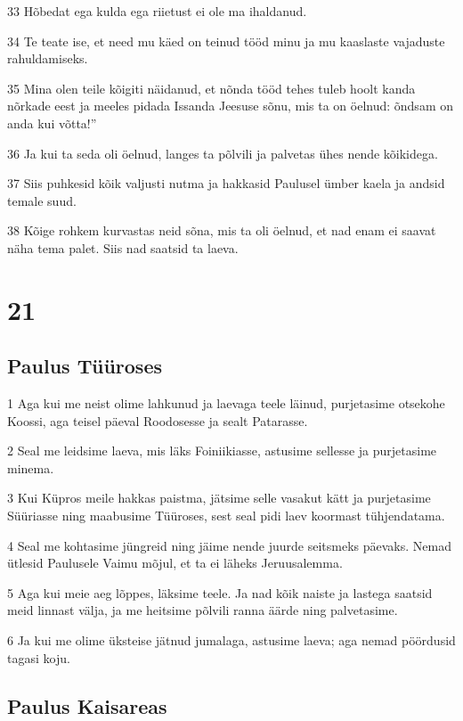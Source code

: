 \par 33 Hõbedat ega kulda ega riietust ei ole ma ihaldanud.
\par 34 Te teate ise, et need mu käed on teinud tööd minu ja mu kaaslaste vajaduste rahuldamiseks.
\par 35 Mina olen teile kõigiti näidanud, et nõnda tööd tehes tuleb hoolt kanda nõrkade eest ja meeles pidada Issanda Jeesuse sõnu, mis ta on öelnud: õndsam on anda kui võtta!”
\par 36 Ja kui ta seda oli öelnud, langes ta põlvili ja palvetas ühes nende kõikidega.
\par 37 Siis puhkesid kõik valjusti nutma ja hakkasid Paulusel ümber kaela ja andsid temale suud.
\par 38 Kõige rohkem kurvastas neid sõna, mis ta oli öelnud, et nad enam ei saavat näha tema palet. Siis nad saatsid ta laeva.


\chapter{21}

\section*{Paulus Tüüroses}

\par 1 Aga kui me neist olime lahkunud ja laevaga teele läinud, purjetasime otsekohe Koossi, aga teisel päeval Roodosesse ja sealt Patarasse.
\par 2 Seal me leidsime laeva, mis läks Foiniikiasse, astusime sellesse ja purjetasime minema.
\par 3 Kui Küpros meile hakkas paistma, jätsime selle vasakut kätt ja purjetasime Süüriasse ning maabusime Tüüroses, sest seal pidi laev koormast tühjendatama.
\par 4 Seal me kohtasime jüngreid ning jäime nende juurde seitsmeks päevaks. Nemad ütlesid Paulusele Vaimu mõjul, et ta ei läheks Jeruusalemma.
\par 5 Aga kui meie aeg lõppes, läksime teele. Ja nad kõik naiste ja lastega saatsid meid linnast välja, ja me heitsime põlvili ranna äärde ning palvetasime.
\par 6 Ja kui me olime üksteise jätnud jumalaga, astusime laeva; aga nemad pöördusid tagasi koju.

\section*{Paulus Kaisareas}

